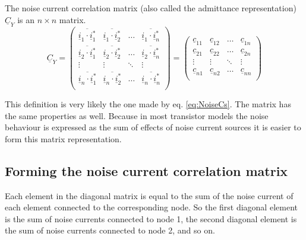 \documentclass[10pt]{report}
\begin{document}
The noise current correlation matrix (also called the admittance
representation) $\underline{C}_Y$ is an $n \times n$ matrix.
\begin{equation}
\underline{C}_Y =
\begin{pmatrix}
\overline{\underline{i}_{1}\cdot \underline{i}_{1}^*} &
    \overline{\underline{i}_{1}\cdot \underline{i}_{2}^*} &
    \ldots & \overline{\underline{i}_{1}\cdot \underline{i}_{n}^*}\\
 \overline{\underline{i}_{2}\cdot \underline{i}_{1}^*} &
    \overline{\underline{i}_{2}\cdot \underline{i}_{2}^*} & \ldots &
    \overline{\underline{i}_{2}\cdot \underline{i}_{n}^*}\\
 \vdots & \vdots & \ddots & \vdots\\
 \overline{\underline{i}_{n}\cdot \underline{i}_{1}^*} &
    \overline{\underline{i}_{n}\cdot \underline{i}_{2}^*} &
    \ldots & \overline{\underline{i}_{n}\cdot \underline{i}_{n}^*}\\
\end{pmatrix}
=
\begin{pmatrix}
  \underline{c}_{11} & \underline{c}_{12} & \ldots & \underline{c}_{1n}\\
  \underline{c}_{21} & \underline{c}_{22} & \ldots & \underline{c}_{2n}\\
  \vdots & \vdots & \ddots & \vdots\\
  \underline{c}_{n1} & \underline{c}_{n2} & \ldots & \underline{c}_{nn}\\
\end{pmatrix}
\end{equation}

This definition is very likely the one made by eq. \eqref{eq:NoiseCs}.
The matrix has the same properties as well.  Because in most
transistor models the noise behaviour is expressed as the sum of
effects of noise current sources it is easier to form this matrix
representation.

\subsection{Forming the noise current correlation matrix}

Each element in the diagonal matrix is equal to the sum of the noise
current of each element connected to the corresponding node.  So the
first diagonal element is the sum of noise currents connected to node
1, the second diagonal element is the sum of noise currents connected
to node 2, and so on.
\end{document}
